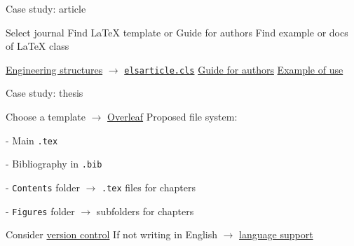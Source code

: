 \begin{frame}{Case study: article}
 
 \begin{fullpageitemize}
	\itemR Select journal 
	\itemR Find LaTeX template or Guide for authors
	\itemR Find example or docs of LaTeX class
 \end{fullpageitemize} 
 \vspace{2ex}
 {\color{colororange}}
 \vspace{2ex}
  \begin{fullpageitemize}
	\itemR \href{https://www.journals.elsevier.com/engineering-structures/}{Engineering structures} $\rightarrow$ \href{https://ctan.org/tex-archive/macros/latex/contrib/elsarticle}{\texttt{elsarticle.cls}}
	\itemR \href{https://www.elsevier.com/journals/engineering-structures/0141-0296/guide-for-authors}{Guide for authors}
	\itemR \href{https://ctan.org/tex-archive/macros/latex/contrib/elsarticle/doc}{Example of use}
 \end{fullpageitemize} 
 
\end{frame}

\begin{frame}{Case study: thesis}
 
 \begin{fullpageitemize}
	\itemR Choose a template $\rightarrow$ \href{https://www.overleaf.com/}{Overleaf}
	\itemR Proposed file system: 
	\vspace{1ex}
	\begin{fullpageitemize}
	 \item[-] Main \texttt{.tex}
	 \item[-] Bibliography in \texttt{.bib}
	 \item[-] \texttt{Contents} folder $\rightarrow$ \texttt{.tex} files for chapters
	 \item[-] \texttt{Figures} folder $\rightarrow$ subfolders for chapters
	\end{fullpageitemize}
	\itemR Consider \href{https://git-scm.com/book/en/v2}{version control}
	\itemR If not writing in English $\rightarrow$ \href{https://en.wikibooks.org/wiki/LaTeX/Internationalization}{language support}
 \end{fullpageitemize} 
 
 
\end{frame}

